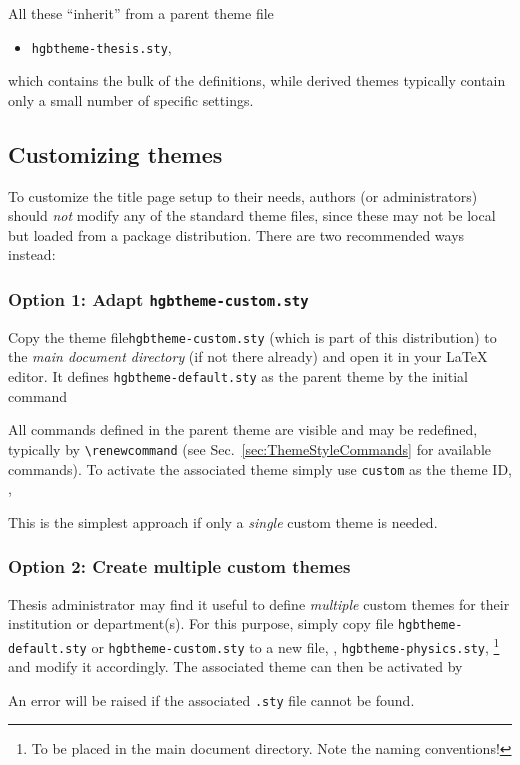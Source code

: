 \documentclass[english]{hgbarticle}
\begin{document}
All these ``inherit'' from a parent theme file
%
\begin{itemize}
  \item[] \texttt{hgbtheme-thesis.sty},
\end{itemize}
%
which contains the bulk of the definitions, while derived themes typically contain only 
a small number of specific settings.


\subsection{Customizing themes}
\label{sec:CustomizingThemes}

To customize the title page setup to their needs, authors (or administrators) should 
\emph{not} modify any of the standard theme files, since these may not be local but loaded
from a package distribution.
There are two recommended ways instead:

\subsubsection{Option 1: Adapt \texttt{hgbtheme-custom.sty}}

Copy the theme file\texttt{hgbtheme-custom.sty} (which is part of this distribution) to the 
\emph{main document directory} (if not there already) and open it in your LaTeX editor.
It defines \texttt{hgbtheme-default.sty} as the parent theme by the initial command
\begin{LaTeXCode}[numbers=none]
\end{LaTeXCode}
%
All commands defined in the parent theme are visible and may be redefined,
typically by \verb!\renewcommand! (see Sec.\ \ref{sec:ThemeStyleCommands}
for available commands).
To activate the associated theme simply use \texttt{custom} as the theme ID,
\ie,
%
%
This is the simplest approach if only a \emph{single} custom theme is needed.

\subsubsection{Option 2: Create multiple custom themes}

Thesis administrator may find it useful to define \emph{multiple} custom themes for their
institution or department(s).
For this purpose, simply copy file \texttt{hgbtheme-default.sty} or \texttt{hgbtheme-custom.sty}
to a new file, \eg, \texttt{hgbtheme-physics.sty},%
\footnote{To be placed in the main document directory. Note the naming conventions!}
and modify it accordingly. The associated theme can then be activated by
%
%
An error will be raised if the associated \texttt{.sty} file cannot be found.
\end{document}
